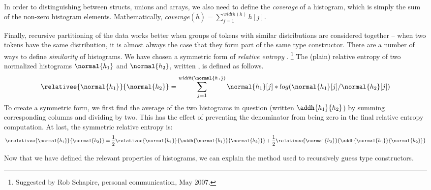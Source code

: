 In order to distinguishing between
structs, unions and arrays,
we also need to define the {\em coverage} of a histogram, which
is simply the sum of the non-zero histogram elements.  Mathematically,
{\em coverage}$(\bar{h}) = \sum_{j=1}^{\mathit{width}(h)} h[j]$.

Finally, recursive partitioning of the data works better when
groups of tokens with similar distributions are considered together
-- when two tokens have the same distribution, it is almost always the 
case that they form part of the same type constructor.  There are a 
number of ways to define {\em similarity} of histograms.  We have
chosen a symmetric form of {\em relative entropy} \cite{Lin91:divergence}.
\footnote{Suggested by Rob Schapire, personal communication, May 2007.}  
The (plain) relative entropy
of two normalized histograms $\normal{h_1}$ and $\normal{h_2}$, 
written , is
defined as follows.
\[
 \relativee{\normal{h_1}}{\normal{h_2}} 
   = \sum_{j=1}^{\mathit{width}(\normal{h_1})} \normal{h_1}[j]*log(\normal{h_1}[j]/\normal{h_2}[j])
\]
To create a symmetric form, we first find the average of the two
histograms in question (written $\addh{h_1}{h_2}$)
by summing corresponding columns and dividing by two.  This
has the effect of preventing the denominator from being zero in the 
final relative entropy computation.  At last, the symmetric
relative entropy is:
\[
 \srelativee{\normal{h_1}}{\normal{h_2}} 
   = \frac{1}{2}  \relativee{\normal{h_1}}{\addh{\normal{h_1}}{\normal{h_2}}}
   +  \frac{1}{2}  \relativee{\normal{h_2}}{\addh{\normal{h_1}}{\normal{h_2}}}
\]

Now that we have defined the relevant properties of histograms,
we can explain the method used to recursively guess type constructors.

